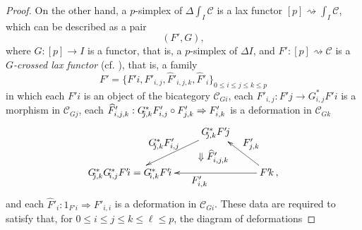 \documentclass[]{amsart}
\begin{document}
\begin{proof}
On the other hand, a $p$-simplex of ${\ensuremath{\Delta}}\int_I{\ensuremath{\mathcal{C}}}$ is a  lax functor $[p]\rightsquigarrow
\int_I{\ensuremath{\mathcal{C}}}$, which can be described as a pair
$$(F',G),$$ where $G:[p]\to I$ is a functor,
that is, a $p$-simplex of ${\ensuremath{\Delta}} I$, and $F':[p]\rightsquigarrow {\ensuremath{\mathcal{C}}}$ is a {\em $G$-crossed lax
functor} (cf. \cite[\S 4.1]{cegarra3}), that is, a family
\begin{equation}\label{xlf}
F'=\{F'\!i,F'_{i,j},\widehat{F}'_{i,j,k},\widehat{F}'_{i}\}_{0\leq i\leq j\leq k\leq p}
\end{equation}
in which each $F'\!i$ is an object of the bicategory ${\ensuremath{\mathcal{C}}}_{Gi}$, each $F'_{i,j}:F'\!j\rightarrow
G_{i,j}^*F'\!i$ is a morphism in ${\ensuremath{\mathcal{C}}}_{Gj}$, each
$\widehat{F}'_{i,j,k}:G_{\hspace{-3pt}j,k}^*F'_{i,j}\circ F'_{j,k}\Rightarrow F'_{i,k}$ is a
deformation in ${\ensuremath{\mathcal{C}}}_{Gk}$
$$
\xymatrix{\ar@{}[drr]|(.6)*+{\textstyle \Downarrow \widehat{F}'_{i,j,k}}
                & G_{\hspace{-3pt}j,k}^*F'\!j \ar[dl]_{\textstyle G_{\hspace{-3pt}j,k}^*F'_{i,j}}             \\
 G_{\hspace{-3pt}j,k}^*G_{\hspace{-2pt}i,j}^*F'\!i=G_{\hspace{-2pt}i,k}^*F'\!i  & &     F'\!k\,,   \ar[ul]_{\textstyle F'_{j,k}} \ar[ll]^{\textstyle F'_{i,k}}}
$$
and each $\widehat{F}'_{i}:1_{F'\!i}\Rightarrow F'_{i,i}$ is a deformation in ${\ensuremath{\mathcal{C}}}_{Gi}$. These data
are required to satisfy that, for $0\leq i\leq j\leq k\leq \ell \leq p$, the diagram of
deformations


\end{proof}
\end{document}
